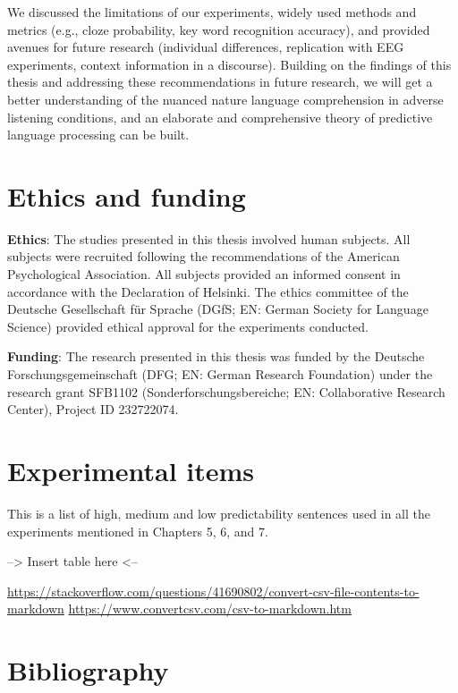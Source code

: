 \documentclass[a4paper, nobind]{templates/ociamthesis}
\begin{document}
We discussed the limitations of our experiments, widely used methods and metrics (e.g., cloze probability, key word recognition accuracy),
and provided avenues for future research (individual differences, replication with EEG experiments, context information in a discourse).
Building on the findings of this thesis and addressing these recommendations in future research,
we will get a better understanding of the nuanced nature language comprehension in adverse listening conditions,
and an elaborate and comprehensive theory of predictive language processing can be built.

\hypertarget{chapter-ethics}{%
\chapter{Ethics and funding}\label{chapter-ethics}}

\noindent 

\textbf{Ethics}: The studies presented in this thesis involved human subjects.
All subjects were recruited following the recommendations of the American Psychological Association.
All subjects provided an informed consent in accordance with the Declaration of Helsinki.
The ethics committee of the Deutsche Gesellschaft für Sprache (DGfS; EN: German Society for Language Science) provided ethical approval for the experiments conducted.

\textbf{Funding}: The research presented in this thesis was funded by the Deutsche Forschungsgemeinschaft (DFG; EN: German Research Foundation) under the research grant SFB1102 (Sonderforschungsbereiche; EN: Collaborative Research Center), Project ID 232722074.

\startappendices

\hypertarget{experimental-items}{%
\chapter{Experimental items}\label{experimental-items}}

This is a list of high, medium and low predictability sentences used in all the experiments mentioned in Chapters 5, 6, and 7.

--\textgreater{} Insert table here \textless--

\url{https://stackoverflow.com/questions/41690802/convert-csv-file-contents-to-markdown}
\url{https://www.convertcsv.com/csv-to-markdown.htm}

\hypertarget{bibliography}{%
\chapter*{Bibliography}\label{bibliography}}
\end{document}
